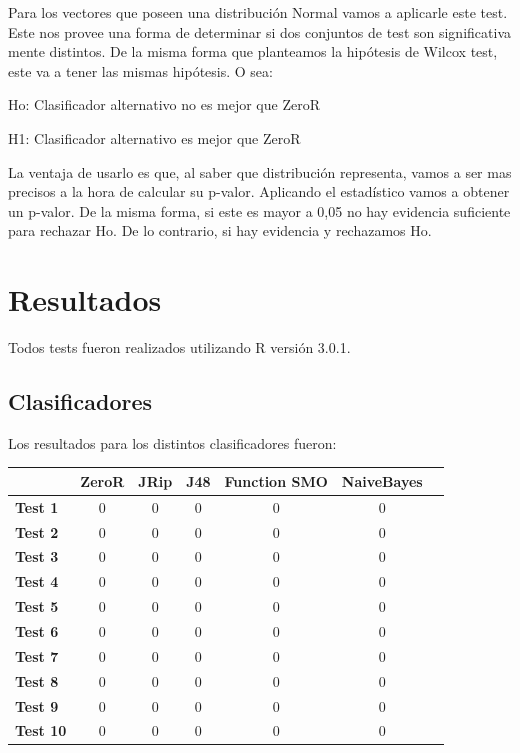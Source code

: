 \documentclass[11pt,a4paper,twoside]{tesis}
\begin{document}
Para los vectores que poseen una distribución Normal vamos a aplicarle este test. Este nos provee una forma de determinar si dos conjuntos de test son significativa mente distintos. De la misma forma que planteamos la hipótesis de Wilcox test, este va a tener las mismas hipótesis. O sea: 

\vspace{0.5cm}
\hspace{2cm}Ho: Clasificador alternativo no es mejor que ZeroR
\vspace{0.25cm}

\hspace{2cm}H1: Clasificador alternativo es mejor que ZeroR
\vspace{0.5cm}

La ventaja de usarlo es que, al saber que distribución representa, vamos a ser mas precisos a la hora de calcular su p-valor. Aplicando el estadístico vamos a obtener un p-valor. De la misma forma, si este es mayor a 0,05 no hay evidencia suficiente para rechazar Ho. De lo contrario, si hay evidencia y rechazamos Ho.

\section{Resultados}

Todos tests fueron realizados utilizando R versión 3.0.1.

\subsection{Clasificadores}
Los resultados para los distintos clasificadores fueron:

\begin{table}[h]
\centering
\begin{tabular}{|l|c|c|c|c|c|c|}
\hline
\textbf{}  & \textbf{ZeroR} & \textbf{JRip} & \textbf{J48} & \textbf{Function SMO} & \textbf{NaiveBayes} \\ \hline
\textbf{Test 1}  & 0 & 0 & 0 & 0 & 0\\ \hline
\textbf{Test 2}  & 0 & 0 & 0 & 0 & 0\\ \hline
\textbf{Test 3}  & 0 & 0 & 0 & 0 & 0\\ \hline
\textbf{Test 4}  & 0 & 0 & 0 & 0 & 0\\ \hline
\textbf{Test 5}  & 0 & 0 & 0 & 0 & 0\\ \hline
\textbf{Test 6}  & 0 & 0 & 0 & 0 & 0\\ \hline
\textbf{Test 7}  & 0 & 0 & 0 & 0 & 0\\ \hline
\textbf{Test 8}  & 0 & 0 & 0 & 0 & 0\\ \hline
\textbf{Test 9}  & 0 & 0 & 0 & 0 & 0\\ \hline
\textbf{Test 10} & 0 & 0 & 0 & 0 & 0\\ \hline
\end{tabular}
\end{table}
\end{document}
